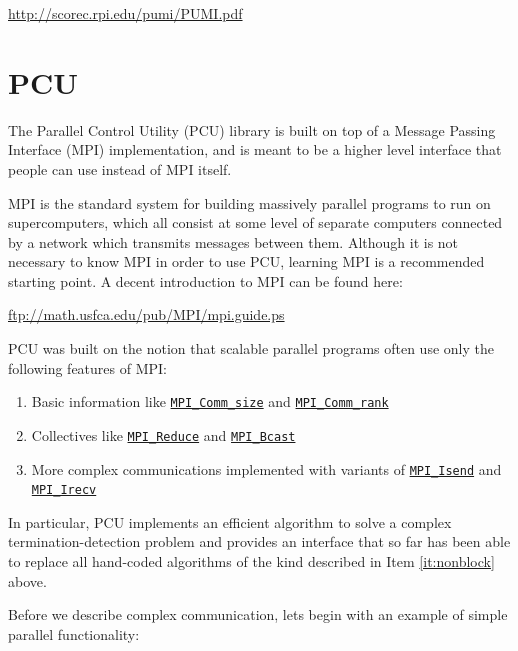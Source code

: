 \documentclass{article}
\begin{document}
\url{http://scorec.rpi.edu/pumi/PUMI.pdf}

\section{PCU}
\label{sec:pcu}

The Parallel Control Utility (PCU) library is built
on top of a Message Passing Interface (MPI) implementation,
and is meant to be a higher level interface that people
can use instead of MPI itself.

MPI is the standard system for building massively parallel
programs to run on supercomputers, which all consist
at some level of separate computers connected by a
network which transmits messages between them.
Although it is not necessary to know MPI in order to use
PCU, learning MPI is a recommended starting point.
A decent introduction to MPI can be found here:

\url{ftp://math.usfca.edu/pub/MPI/mpi.guide.ps}

PCU was built on the notion that scalable parallel
programs often use only the following features of MPI:

\begin{enumerate}
\item Basic information like
\href{http://www.mpich.org/static/docs/v3.1/www3/MPI_Comm_size.html}{\texttt{MPI\_Comm\_size}}
and
\href{http://www.mpich.org/static/docs/v3.1/www3/MPI_Comm_rank.html}{\texttt{MPI\_Comm\_rank}}
\item Collectives like
\href{http://www.mpich.org/static/docs/v3.1/www3/MPI_Reduce.html}{\texttt{MPI\_Reduce}}
and
\href{http://www.mpich.org/static/docs/v3.1/www3/MPI_Bcast.html}{\texttt{MPI\_Bcast}}
\item \label{it:nonblock} More complex communications implemented with variants of
\href{http://www.mpich.org/static/docs/v3.1/www3/MPI_Isend.html}{\texttt{MPI\_Isend}}
and
\href{http://www.mpich.org/static/docs/v3.1/www3/MPI_Irecv.html}{\texttt{MPI\_Irecv}}
\end{enumerate}

In particular, PCU implements an efficient algorithm to solve a complex
termination-detection problem and provides an interface that
so far has been able to replace all hand-coded algorithms
of the kind described in Item \ref{it:nonblock} above.

Before we describe complex communication, lets begin with an example
of simple parallel functionality:


\end{document}
